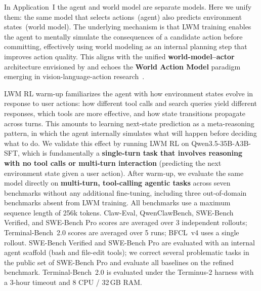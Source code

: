 \documentclass{llmxive}
\begin{document}
In Application~I the agent and world model are separate models.
Here we unify them: the same model that selects actions~(agent) also predicts environment states~(world model).
The underlying mechanism is that LWM training enables the agent to mentally simulate the consequences of a candidate action before committing, effectively using world modeling as an internal planning step that improves action quality.
This aligns with the unified \textbf{world-model--actor} architecture envisioned by \citet{lecun2022path} and echoes the \textbf{World Action Model} paradigm emerging in vision-language-action research~\citep{ye2026world}.

LWM RL warm-up familiarizes the agent with how environment states evolve in response to user actions: how different tool calls and search queries yield different responses, which tools are more effective, and how state transitions propagate across turns.
This amounts to learning next-state prediction as a meta-reasoning pattern, in which the agent internally simulates what will happen before deciding what to do.
We validate this effect by running LWM RL on Qwen3.5-35B-A3B-SFT, which is fundamentally a \textbf{single-turn task that involves reasoning with no tool calls or multi-turn interaction} (predicting the next environment state given a user action).
After warm-up, we evaluate the same model directly on \textbf{multi-turn, tool-calling agentic tasks} across seven benchmarks without any additional fine-tuning, including three out-of-domain benchmarks absent from LWM training.
All benchmarks use a maximum sequence length of 256k tokens.
Claw-Eval, QwenClawBench, SWE-Bench Verified, and SWE-Bench Pro scores are averaged over 3 independent rollouts; Terminal-Bench~2.0 scores are averaged over 5 runs; BFCL~v4 uses a single rollout.
SWE-Bench Verified and SWE-Bench Pro are evaluated with an internal agent scaffold (bash and file-edit tools); we correct several problematic tasks in the public set of SWE-Bench Pro and evaluate all baselines on the refined benchmark.
Terminal-Bench~2.0 is evaluated under the Terminus-2 harness with a 3-hour timeout and 8 CPU / 32\,GB RAM.
\end{document}
